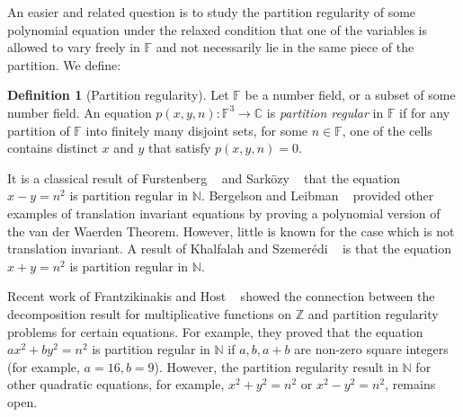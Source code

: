 \documentclass[12pt,amstex]{amsart}
\theoremstyle{definition}
\newtheorem{defn}[thm]{Definition}
\begin{document}
An easier and related question is to study the partition regularity of some polynomial equation under the relaxed condition that one of the variables is allowed to vary freely in $\mathbb{F}$ and not necessarily lie in the same piece of the partition. We define:
\begin{defn}[Partition regularity]
  Let $\mathbb{F}$ be a number field, or a subset of some number field. An equation $p(x,y,n)\colon \mathbb{F}^{3}\rightarrow\mathbb{C}$ is \emph{partition regular} in $\mathbb{F}$ if
  for any partition of $\mathbb{F}$ into finitely many disjoint sets, for some $n\in \mathbb{F}$, one of the cells contains distinct $x$ and $y$ that satisfy $p(x,y,n)=0$.
\end{defn}
 It is a classical result of Furstenberg ~\cite{7} and Sark\"{o}zy ~\cite{25} that the equation $x-y=n^{2}$ is partition regular in $\mathbb{N}$. Bergelson and Leibman ~\cite{BL} provided other examples of translation invariant equations by proving a polynomial version of the van der Waerden Theorem. However, little is
known for the case which is not translation invariant. A result of Khalfalah and Szemer\'{e}di ~\cite{KS} is that the equation $x+y=n^{2}$ is partition regular in $\mathbb{N}$.

Recent work of Frantzikinakis and Host ~\cite{FH} showed the connection between the decomposition result for multiplicative functions on $\mathbb{Z}$ and partition regularity problems for certain equations. For example, they proved that the equation $ax^{2}+by^{2}=n^{2}$ is partition regular in $\mathbb{N}$ if $a,b,a+b$ are non-zero square integers (for example, $a=16, b=9$). However, the partition regularity result in $\mathbb{N}$ for other quadratic equations, for example, $x^{2}+y^{2}=n^{2}$ or $x^{2}-y^{2}=n^{2}$, remains open.
\end{document}
